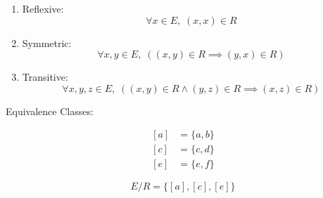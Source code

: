 \documentclass[12pt,a4paper,openany]{article}
\begin{document}
\begin{enumerate}
\item Reflexive:
   \[
   \forall x \in E, \; (x,x) \in R
   \]

\item Symmetric:
   \[
   \forall x, y \in E, \; ((x,y) \in R \implies (y,x) \in R)
   \]

\item Transitive:
   \[
   \forall x, y, z \in E, \; ((x,y) \in R \wedge (y,z) \in R \implies (x,z) \in R)
   \]
\end{enumerate}

Equivalence Classes:

\[
\begin{aligned}
[a] &= \{a, b\} \\
[c] &= \{c, d\} \\
[e] &= \{e, f\}
\end{aligned}
\]

\[
E/R = \{[a], [c], [e]\}
\]
\end{document}
